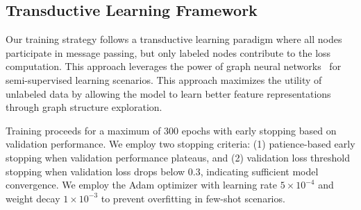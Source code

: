 \subsection{Transductive Learning Framework}

Our training strategy follows a transductive learning paradigm where all nodes participate in message passing, but only labeled nodes contribute to the loss computation. This approach leverages the power of graph neural networks~\cite{wu2020comprehensive, bronstein2017geometric} for semi-supervised learning scenarios. This approach maximizes the utility of unlabeled data by allowing the model to learn better feature representations through graph structure exploration.

Training proceeds for a maximum of 300 epochs with early stopping based on validation performance. We employ two stopping criteria: (1) patience-based early stopping when validation performance plateaus, and (2) validation loss threshold stopping when validation loss drops below 0.3, indicating sufficient model convergence. We employ the Adam optimizer with learning rate $5 \times 10^{-4}$ and weight decay $1 \times 10^{-3}$ to prevent overfitting in few-shot scenarios.

\EndChapter
